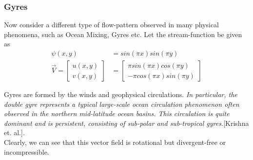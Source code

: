 \documentclass{book}
\begin{document}
\subsubsection{Gyres}
Now consider a different type of flow-pattern observed in many physical phenomena, such as Ocean Mixing, Gyres etc. Let the stream-function be given as\textemdash
\begin{equation*}
\begin{split}
\psi(x,y)&=sin(\pi x)sin(\pi y)\\
\vec{V}=\begin{bmatrix}u(x,y)\\v(x,y)\end{bmatrix}&=\begin{bmatrix}\pi sin(\pi x)cos(\pi y)\\-\pi cos(\pi x)sin(\pi y)\end{bmatrix}
\end{split}
\end{equation*}
\begin{center}
\end{center} 
Gyres are formed by the winds and geophysical circulations. \textit{In particular, the double gyre represents a typical large-scale ocean circulation phenomenon often observed in the northern mid-latitude ocean basins. This circulation is quite dominant and is persistent, consisting of sub-polar and sub-tropical gyres.}[Krishna et. al.].\\
Clearly, we can see that this vector field is rotational but divergent-free or incompressible.
\end{document}
